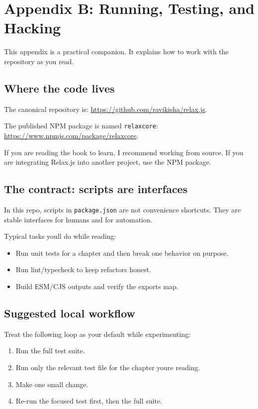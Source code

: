 \chapter{Appendix B: Running, Testing, and Hacking}

This appendix is a practical companion.
It explains how to work with the repository as you read.

\section{Where the code lives}
The canonical repository is:
\href{https://github.com/ravikisha/relax.js}{https://github.com/ravikisha/relax.js}.

The published NPM package is named \texttt{relaxcore}:
\href{https://www.npmjs.com/package/relaxcore}{https://www.npmjs.com/package/relaxcore}.

If you are reading the book to learn, I recommend working from source.
If you are integrating Relax.js into another project, use the NPM package.

\section{The contract: scripts are interfaces}
In this repo, scripts in \texttt{package.json} are not convenience shortcuts.
They are stable interfaces for humans and for automation.

Typical tasks you\textquotesingle ll do while reading:

\begin{itemize}
  \item Run unit tests for a chapter and then break one behavior on purpose.
  \item Run lint/typecheck to keep refactors honest.
  \item Build ESM/CJS outputs and verify the exports map.
\end{itemize}

\section{Suggested local workflow}
Treat the following loop as your default while experimenting:

\begin{enumerate}
  \item Run the full test suite.
  \item Run only the relevant test file for the chapter you\textquotesingle re reading.
  \item Make one small change.
  \item Re-run the focused test first, then the full suite.
\end{enumerate}

